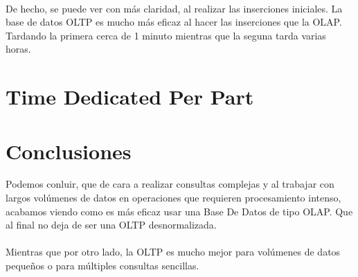 \documentclass[a4paper 
,twoside
]{article}
\begin{document}
\paragraph{}
De hecho, se puede ver con más claridad, al realizar las inserciones iniciales. La base de datos OLTP es mucho más eficaz al hacer las inserciones que la OLAP. Tardando la primera cerca de 1 minuto mientras que la seguna tarda varias horas.
\pagebreak
\section{Time Dedicated Per Part}
\pagebreak
\section{Conclusiones}
Podemos conluir, que de cara a realizar consultas complejas y al trabajar con largos volúmenes de datos en operaciones que requieren procesamiento intenso, acabamos viendo como es más eficaz usar una Base De Datos de tipo OLAP. Que al final no deja de ser una OLTP desnormalizada.

\paragraph{}
Mientras que por otro lado, la OLTP es mucho mejor para volúmenes de datos pequeños o para múltiples consultas sencillas.

\pagebreak
  
  \nocite{*}
  \printbibliography[title={Bibliografía}]
\end{document}
